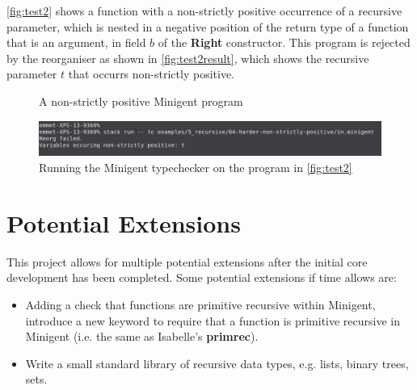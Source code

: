 \autoref{fig:test2} shows a function with a non-strictly positive occurrence of a recursive parameter, which is nested in 
a negative position of the return type of a function that is an argument, in field $b$ of the \textbf{Right} constructor.
This program is rejected by the reorganiser
as shown in \autoref{fig:test2result}, which shows the recursive parameter $t$ that occurrs non-strictly positive.

\begin{figure}
    \centering
    
    \caption{A non-strictly positive Minigent program}
    \label{fig:test2}
\end{figure}

\begin{figure}
    \centering
    \includegraphics[width=\linewidth]{content/test2result.png}
    \caption{Running the Minigent typechecker on the program in \autoref{fig:test2}}
    \label{fig:test2result}
\end{figure}

\section{Potential Extensions}
\label{sec:proposedextensions}

This project allows for multiple potential extensions after the initial core development has been completed.
Some potential extensions if time allows are:

\begin{itemize}
    \item Adding a check that functions are primitive recursive within Minigent, introduce a new keyword
          to require that a function is primitive recursive in Minigent (i.e. the same as
          Isabelle's \textbf{primrec}).
    \item Write a small standard library of recursive data types, e.g. lists, binary trees, 
          sets.
\end{itemize}
